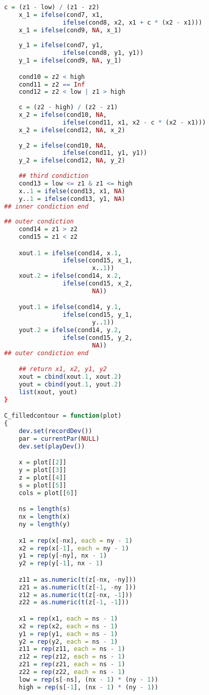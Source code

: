 \begin{lstlisting}[language = R]
    c = (z1 - low) / (z1 - z2)
    x_1 = ifelse(cond7, x1, 
                ifelse(cond8, x2, x1 + c * (x2 - x1)))
    x_1 = ifelse(cond9, NA, x_1)
                
    y_1 = ifelse(cond7, y1, 
                ifelse(cond8, y1, y1))
    y_1 = ifelse(cond9, NA, y_1)

    cond10 = z2 < high
    cond11 = z2 == Inf
    cond12 = z2 < low | z1 > high
                
    c = (z2 - high) / (z2 - z1)
    x_2 = ifelse(cond10, NA, 
                ifelse(cond11, x1, x2 - c * (x2 - x1)))
    x_2 = ifelse(cond12, NA, x_2)
                
    y_2 = ifelse(cond10, NA, 
                ifelse(cond11, y1, y1))
    y_2 = ifelse(cond12, NA, y_2)
                
    ## third condiction
    cond13 = low <= z1 & z1 <= high
    x..1 = ifelse(cond13, x1, NA)
    y..1 = ifelse(cond13, y1, NA)
## inner condiction end
    
## outer condiction 
    cond14 = z1 > z2
    cond15 = z1 < z2

    xout.1 = ifelse(cond14, x.1,
                ifelse(cond15, x_1,
                        x..1))
    xout.2 = ifelse(cond14, x.2,
                ifelse(cond15, x_2,
                        NA))						

    yout.1 = ifelse(cond14, y.1,
                ifelse(cond15, y_1,
                        y..1))
    yout.2 = ifelse(cond14, y.2,
                ifelse(cond15, y_2,
                        NA))			
## outer condiction end

    ## return x1, x2, y1, y2
    xout = cbind(xout.1, xout.2)
    yout = cbind(yout.1, yout.2)
    list(xout, yout)
}

C_filledcontour = function(plot)
{
    dev.set(recordDev())
    par = currentPar(NULL)
    dev.set(playDev())

    x = plot[[2]]
    y = plot[[3]]
    z = plot[[4]]
    s = plot[[5]]
    cols = plot[[6]]

    ns = length(s)
    nx = length(x)
    ny = length(y)

    x1 = rep(x[-nx], each = ny - 1)
    x2 = rep(x[-1], each = ny - 1)
    y1 = rep(y[-ny], nx - 1)
    y2 = rep(y[-1], nx - 1)

    z11 = as.numeric(t(z[-nx, -ny]))
    z21 = as.numeric(t(z[-1, -ny ]))
    z12 = as.numeric(t(z[-nx, -1]))
    z22 = as.numeric(t(z[-1, -1]))

    x1 = rep(x1, each = ns - 1)
    x2 = rep(x2, each = ns - 1)
    y1 = rep(y1, each = ns - 1)
    y2 = rep(y2, each = ns - 1)
    z11 = rep(z11, each = ns - 1)
    z12 = rep(z12, each = ns - 1)
    z21 = rep(z21, each = ns - 1)
    z22 = rep(z22, each = ns - 1)
    low = rep(s[-ns], (nx - 1) * (ny - 1))
    high = rep(s[-1], (nx - 1) * (ny - 1))


\end{lstlisting}
